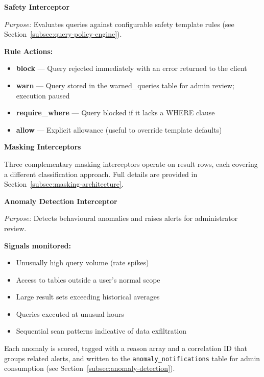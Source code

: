 \vspace{0.3cm}

\textbf{Safety Interceptor}

\textit{Purpose:} Evaluates queries against configurable safety template rules (see Section~\ref{subsec:query-policy-engine}).

\textbf{Rule Actions:}
\begin{itemize}[leftmargin=*]
    \item \textbf{block} — Query rejected immediately with an error returned to the client
    \item \textbf{warn} — Query stored in the warned\_queries table for admin review; execution paused
    \item \textbf{require\_where} — Query blocked if it lacks a WHERE clause
    \item \textbf{allow} — Explicit allowance (useful to override template defaults)
\end{itemize}

\vspace{0.3cm}

\textbf{Masking Interceptors}

Three complementary masking interceptors operate on result rows, each covering a different classification approach. Full details are provided in Section~\ref{subsec:masking-architecture}.

\vspace{0.3cm}

\textbf{Anomaly Detection Interceptor}

\textit{Purpose:} Detects behavioural anomalies and raises alerts for administrator review.

\textbf{Signals monitored:}
\begin{itemize}[leftmargin=*]
    \item Unusually high query volume (rate spikes)
    \item Access to tables outside a user's normal scope
    \item Large result sets exceeding historical averages
    \item Queries executed at unusual hours
    \item Sequential scan patterns indicative of data exfiltration
\end{itemize}

Each anomaly is scored, tagged with a reason array and a correlation ID that groups related alerts, and written to the \texttt{anomaly\_notifications} table for admin consumption (see Section~\ref{subsec:anomaly-detection}).

